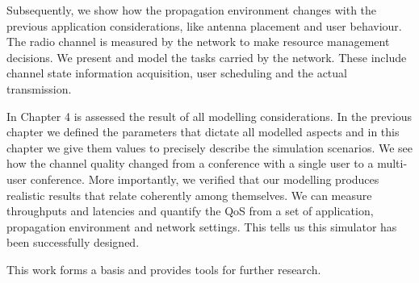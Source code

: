 Subsequently, we show how the propagation environment changes with the previous application considerations, like antenna placement and user behaviour. The radio channel is measured by the network to make resource management decisions. We present and model the tasks carried by the network. These include channel state information acquisition, user scheduling and the actual transmission.

In Chapter 4 is assessed the result of all modelling considerations. In the previous chapter we defined the parameters that dictate all modelled aspects and in this chapter we give them values to precisely describe the simulation scenarios. We see how the channel quality changed from a conference with a single user to a multi-user conference. More importantly, we verified that our modelling produces realistic results that relate coherently among themselves. We can measure throughputs and latencies and quantify the QoS from a set of application, propagation environment and network settings. This tells us this simulator has been successfully designed.

This work forms a basis and provides tools for further research. 
